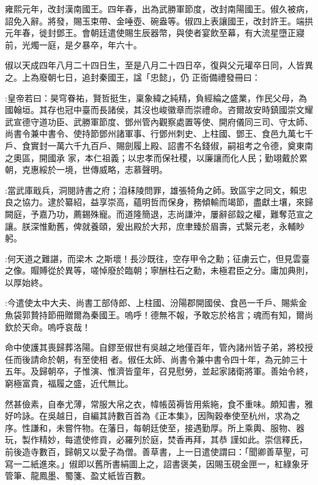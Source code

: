 \begin{pinyinscope}
 雍熙元年，改封漢南國王。四年春，出為武勝軍節度，改封南陽國王。俶久被病，詔免入辭。將發，賜玉束帶、金唾壺、碗盎等。俶四上表讓國王，改封許王。端拱元年春，徙封鄧王。會朝廷遣使賜生辰器幣，與使者宴飲至幕，有大流星墮正寢前，光燭一庭，是夕暴卒，年六十。



 俶以天成四年八月二十四日生，至是八月二十四日卒，復與父元瓘卒日同，人皆異之。上為廢朝七日，追封秦國王，諡「忠懿」，仍
 正衙備禮發冊曰：



 :皇帝若曰：昊穹眷祐，賢哲挺生，稟象緯之純精，負經綸之盛業，作民父母，為國翰垣。其存也冠中臺而長諸侯，其沒也峻徽章而崇禮命。咨爾故安時鎮國崇文耀武宣德守道功臣、武勝軍節度、鄧州管內觀察處置等使、開府儀同三司、守太師、尚書令兼中書令、使持節鄧州諸軍事、行鄧州刺史、上柱國、鄧王、食邑九萬七千戶、食實封一萬六千九百戶、賜劍履上殿、詔書不名錢俶，嗣祖考之令德，奠東南之奧區，開國承
 家，本仁祖義；以忠孝而保社稷，以廉讓而化人民；勤翊戴於累朝，克惠綏於一境，世傳威略，志慕聲明。



 :當武庫戢兵，洞閱詩書之府；洎秣陵問罪，雄張犄角之師。致區宇之同文，賴忠良之協力。逮於纂紹，益享崇高，蘊明哲而保身，務傾輸而竭節，盡獻土壤，來歸闕庭，予嘉乃功，薦錫殊寵。而道隆簡退，志尚謙沖，屢辭郤縠之權，難奪范宣之讓。朕深惟勳舊，俾就養頤，爰出殿於大邦，庶聿臻於眉壽，式繄元老，永輔眇躬。



 :何天道之難諶，而梁木
 之斯壞！長沙既往，空存甲令之勳；征虜云亡，但見雲臺之像。賵賻從於異等，嗟悼廢於臨朝；寧酬柱石之勳，未極君臣之分。庸加典則，以厚始終。



 :今遣使太中大夫、尚書工部侍郎、上柱國、汾陽郡開國侯、食邑一千戶、賜紫金魚袋郭贄持節冊贈爾為秦國王。嗚呼！德無不報，予敢忘於格言；魂而有知，爾尚欽於天命。嗚呼哀哉！



 命中使護其喪歸葬洛陽。自鏐至俶世有吳越之地僅百年，管內諸州皆子弟，將校授任而後請命於朝，有至使相
 者。俶任太師、尚書令兼中書令四十年，為元帥三十五年。及歸朝卒，子惟演、惟濟皆童年，召見慰勞，並起家諸衛將軍。善始令終，窮極富貴，福履之盛，近代無比。



 然甚儉素，自奉尤薄，常服大帛之衣，幃帳茵褥皆用紫絁，食不重味。頗知書，雅好吟詠。在吳越日，自編其詩數百首為《正本集》，因陶穀奉使至杭州，求為之序。性謙和，未嘗忤物。在藩日，每朝廷使至，接遇勤厚。所上乘輿、服物、器玩，製作精妙，每遣使修貢，必羅列於庭，焚香再拜，其恭
 謹如此。崇信釋氏，前後造寺數百，歸朝又以愛子為僧。善草書，上一日遣使謂曰：「聞卿善草聖，可寫一二紙進來。」俶即以舊所書絹圖上之，詔書褒美，因賜玉硯金匣一，紅綠象牙管筆、龍鳳墨、蜀箋、盈丈紙皆百數。




\end{pinyinscope}
